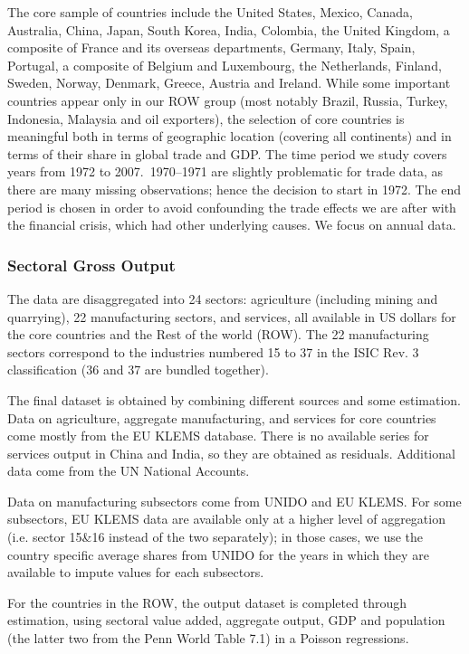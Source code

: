 \documentclass[12pt]{article}
\begin{document}
The core sample of countries include the United States, Mexico, Canada,
Australia, China, Japan, South Korea, India, Colombia, the United Kingdom, a
composite of France and its overseas departments, Germany, Italy, Spain,
Portugal, a composite of Belgium and Luxembourg, the Netherlands, Finland,
Sweden, Norway, Denmark, Greece, Austria and Ireland. While some important
countries appear only in our ROW group (most notably Brazil, Russia, Turkey,
Indonesia, Malaysia and oil exporters), the selection of core countries is
meaningful both in terms of geographic location (covering all continents)
and in terms of their share in global trade and GDP. The time period we
study covers years from 1972 to 2007.\ 1970--1971 are slightly problematic
for trade data, as there are many missing observations; hence the decision
to start in 1972. The end period is chosen in order to avoid confounding the
trade effects we are after with the financial crisis, which had other
underlying causes. We focus on annual data.

\subsubsection*{Sectoral Gross Output}

The data are disaggregated into 24 sectors: agriculture (including mining
and quarrying), 22 manufacturing sectors, and services, all available in US
dollars for the core countries and the Rest of the world (ROW). The 22
manufacturing sectors correspond to the industries numbered 15 to 37 in the
ISIC Rev. 3 classification (36 and 37 are bundled together).

The final dataset is obtained by combining different sources and some
estimation. Data on agriculture, aggregate manufacturing, and services for
core countries come mostly from the EU KLEMS database. There is no available
series for services output in China and India, so they are obtained as
residuals. Additional data come from the UN National Accounts.

Data on manufacturing subsectors come from UNIDO and EU KLEMS. For some
subsectors, EU KLEMS data are available only at a higher level of
aggregation (i.e. sector 15\&16 instead of the two separately); in those
cases, we use the country specific average shares from UNIDO for the years
in which they are available to impute values for each subsectors.

For the countries in the ROW, the output dataset is completed through
estimation, using sectoral value added, aggregate output, GDP and population
(the latter two from the Penn World Table 7.1) in a Poisson regressions.
\end{document}
